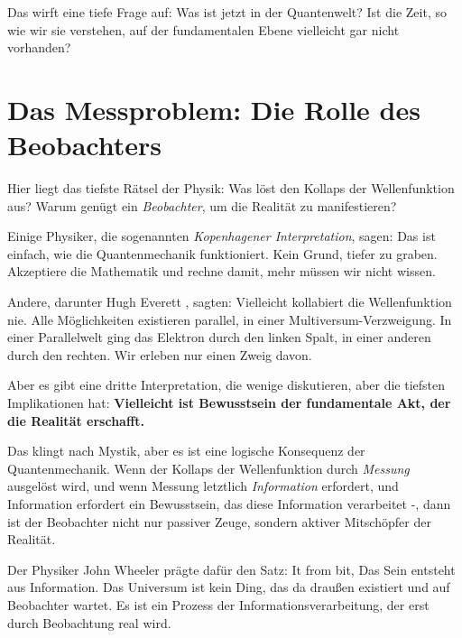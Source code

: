 Das wirft eine tiefe Frage auf: Was ist \glqq jetzt\grqq{} in der Quantenwelt? Ist die Zeit, so wie wir sie verstehen, auf der fundamentalen Ebene vielleicht gar nicht vorhanden?

\section{Das Messproblem: Die Rolle des Beobachters}

Hier liegt das tiefste Rätsel der Physik: Was löst den Kollaps der Wellenfunktion aus? Warum genügt ein \emph{Beobachter}, um die Realität zu manifestieren?

Einige Physiker, die sogenannten \emph{Kopenhagener Interpretation}, sagen: Das ist einfach, wie die Quantenmechanik funktioniert. Kein Grund, tiefer zu graben. Akzeptiere die Mathematik und rechne damit, mehr müssen wir nicht wissen.

Andere, darunter Hugh Everett \cite{Everett1957}, sagten: Vielleicht kollabiert die Wellenfunktion nie. Alle Möglichkeiten existieren parallel, in einer Multiversum-Verzweigung. In einer Parallelwelt ging das Elektron durch den linken Spalt, in einer anderen durch den rechten. Wir erleben nur einen Zweig davon.

Aber es gibt eine dritte Interpretation, die wenige diskutieren, aber die tiefsten Implikationen hat: \textbf{Vielleicht ist Bewusstsein der fundamentale Akt, der die Realität erschafft.}

Das klingt nach Mystik, aber es ist eine logische Konsequenz der Quantenmechanik. Wenn der Kollaps der Wellenfunktion durch \emph{Messung} ausgelöst wird, und wenn Messung letztlich \emph{Information} erfordert, und Information erfordert ein Bewusstsein, das diese Information verarbeitet -, dann ist der Beobachter nicht nur passiver Zeuge, sondern aktiver Mitschöpfer der Realität.

Der Physiker John Wheeler prägte dafür den Satz: \glqq It from bit\grqq{}, Das Sein entsteht aus Information. Das Universum ist kein Ding, das \glqq da draußen\grqq{} existiert und auf Beobachter wartet. Es ist ein Prozess der Informationsverarbeitung, der erst durch Beobachtung \glqq real\grqq{} wird.

